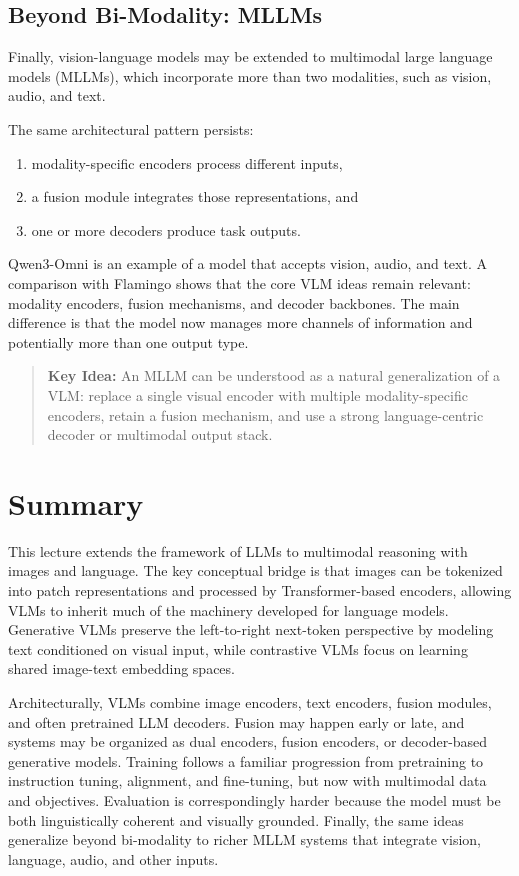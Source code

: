 \documentclass{article}
\newenvironment{keyidea}{\begin{quote}\noindent\textbf{Key Idea:} }{\end{quote}}
\begin{document}
\subsection{Beyond Bi-Modality: MLLMs}

Finally, vision-language models may be extended to multimodal large language models (MLLMs), which incorporate more than two modalities, such as vision, audio, and text.

The same architectural pattern persists:
\begin{enumerate}
    \item modality-specific encoders process different inputs,
    \item a fusion module integrates those representations, and
    \item one or more decoders produce task outputs.
\end{enumerate}

Qwen3-Omni is an example of a model that accepts vision, audio, and text. A comparison with Flamingo shows that the core VLM ideas remain relevant: modality encoders, fusion mechanisms, and decoder backbones. The main difference is that the model now manages more channels of information and potentially more than one output type.

\begin{keyidea}
An MLLM can be understood as a natural generalization of a VLM: replace a single visual encoder with multiple modality-specific encoders, retain a fusion mechanism, and use a strong language-centric decoder or multimodal output stack.
\end{keyidea}

\section{Summary}
This lecture extends the framework of LLMs to multimodal reasoning with images and language. The key conceptual bridge is that images can be tokenized into patch representations and processed by Transformer-based encoders, allowing VLMs to inherit much of the machinery developed for language models. Generative VLMs preserve the left-to-right next-token perspective by modeling text conditioned on visual input, while contrastive VLMs focus on learning shared image-text embedding spaces.

Architecturally, VLMs combine image encoders, text encoders, fusion modules, and often pretrained LLM decoders. Fusion may happen early or late, and systems may be organized as dual encoders, fusion encoders, or decoder-based generative models. Training follows a familiar progression from pretraining to instruction tuning, alignment, and fine-tuning, but now with multimodal data and objectives. Evaluation is correspondingly harder because the model must be both linguistically coherent and visually grounded. Finally, the same ideas generalize beyond bi-modality to richer MLLM systems that integrate vision, language, audio, and other inputs.
\end{document}
